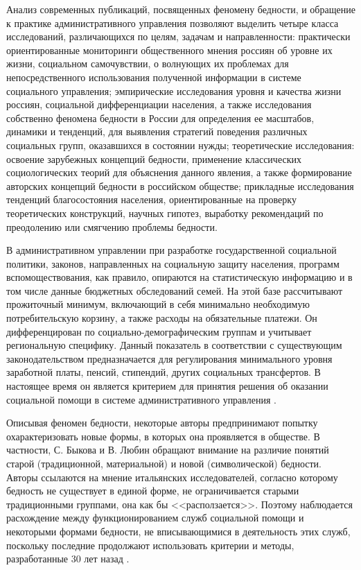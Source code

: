 Анализ современных публикаций, посвященных феномену бедности, и обращение к 
практике административного управления позволяют выделить четыре класса 
исследований, различающихся по целям, задачам и направленности: практически 
ориентированные мониторинги общественного мнения россиян об уровне их жизни, 
социальном самочувствии, о волнующих их проблемах для непосредственного 
использования полученной информации в системе социального управления; 
эмпирические исследования уровня и качества жизни россиян, социальной 
дифференциации населения, а также исследования собственно феномена бедности в 
России для определения ее масштабов, динамики и тенденций, для выявления 
стратегий поведения различных социальных групп, оказавшихся в состоянии нужды; 
теоретические исследования: освоение зарубежных концепций бедности, 
применение классических социологических теорий для объяснения данного явления, 
а также формирование авторских концепций бедности в российском обществе; 
прикладные исследования тенденций благосостояния населения, ориентированные 
на проверку теоретических конструкций, научных гипотез, выработку рекомендаций 
по преодолению или смягчению проблемы бедности.

В административном управлении при разработке государственной социальной 
политики, законов, направленных на социальную защиту населения, программ 
вспомоществования, как правило, опираются на статистическую информацию и в том 
числе данные бюджетных обследований семей. На этой базе рассчитывают 
прожиточный минимум, включающий в себя минимально необходимую потребительскую 
корзину, а также расходы на обязательные платежи. Он дифференцирован по 
социально-демографическим группам и учитывает региональную специфику. Данный 
показатель в соответствии с существующим законодательством предназначается 
для регулирования минимального уровня заработной платы, пенсий, стипендий, 
других социальных трансфертов. В настоящее время он является критерием для 
принятия решения об оказании социальной помощи в системе административного 
управления \cite{volch}.

Описывая феномен бедности, некоторые авторы предпринимают попытку 
охарактеризовать новые формы, в которых она проявляется в обществе. В 
частности, С. Быкова и В. Любин обращают внимание на различие понятий старой 
(традиционной, материальной) и новой (символической) бедности. Авторы 
ссылаются на мнение итальянских исследователей, согласно которому бедность не 
существует в единой форме, не ограничивается старыми традиционными группами, 
она как бы <<расползается>>. Поэтому наблюдается расхождение между 
функционированием служб социальной помощи и некоторыми формами бедности, 
не вписывающимися в деятельность этих служб, поскольку последние продолжают 
использовать критерии и методы, разработанные 30 лет назад \cite{volch_s1}.

